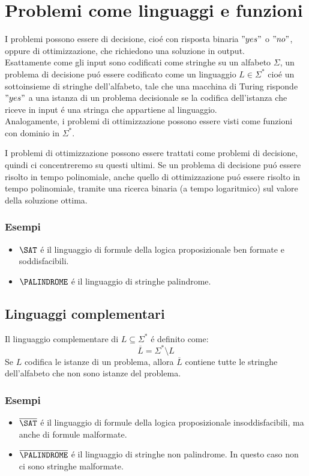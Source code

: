 
\section{Problemi come linguaggi e funzioni}
I problemi possono essere di decisione, cioé con risposta binaria $"yes"$ o $"no"$, 
oppure di ottimizzazione, che richiedono una soluzione in output. \\

Esattamente come gli input sono codificati come stringhe su un alfabeto $\Sigma$, 
un problema di decisione puó essere codificato come un linguaggio $L \in \Sigma^*$ 
cioé un sottoinsieme di stringhe dell'alfabeto, tale che una macchina di Turing 
risponde $"yes"$ a una istanza di un problema decisionale se la codifica dell'istanza 
che riceve in input é una stringa che appartiene al linguaggio. \\

Analogamente, i problemi di ottimizzazione possono essere visti come funzioni con dominio in $\Sigma^*$.

I problemi di ottimizzazione possono essere trattati come problemi di decisione, quindi
ci concentreremo su questi ultimi. Se un problema di decisione puó essere risolto in tempo polinomiale,
anche quello di ottimizzazione puó essere risolto in tempo polinomiale, tramite una ricerca binaria (a tempo logaritmico)
sul valore della soluzione ottima.
\subsubsection*{Esempi}
\begin{itemize}
	\item ${\SAT}$ é il linguaggio di formule della logica proposizionale ben formate e soddisfacibili.
	\item ${\PALINDROME}$ é il linguaggio di stringhe palindrome.
\end{itemize}


\subsection{Linguaggi complementari}
Il linguaggio complementare di $L \subseteq \Sigma^*$ é definito come:
\[\overline{L} = \Sigma^* \setminus L\]
Se $L$ codifica le istanze di un problema, allora $\overline{L}$ contiene tutte le stringhe dell'alfabeto che non sono istanze del problema.
\subsubsection*{Esempi}
\begin{itemize}
	\item $\overline{\SAT}$ é il linguaggio di formule della logica proposizionale insoddisfacibili, ma anche di formule malformate.
	\item $\overline{\PALINDROME}$ é il linguaggio di stringhe non palindrome. In questo caso non ci sono stringhe malformate.
\end{itemize}


